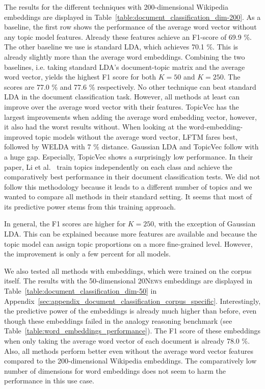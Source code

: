 \documentclass[
        a4paper,
        titlepage,
        twoside,
        parskip,
        numbers=noenddot
        ]{scrbook}
\theoremstyle{break}
\begin{document}
The results for the different techniques with 200-dimensional Wikipedia embeddings are displayed in Table~\ref{table:document_classification_dim-200}.
As a baseline, the first row shows the performance of the average word vector without any topic model features.
Already these features achieve an F1-score of 69.9 \%.
The other baseline we use is standard LDA, which achieves 70.1 \%.
This is already slightly more than the average word embeddings.
Combining the two baselines, i.e. taking standard LDA's document-topic matrix and the average word vector, yields the highest F1 score for both $K = 50$ and $K = 250$.
The scores are 77.0 \% and 77.6 \% respectively.
No other technique can beat standard LDA in the document classification task.
However, all methods at least can improve over the average word vector with their features.
TopicVec has the largest improvements when adding the average word embedding vector, however, it also had the worst results without.
When looking at the word-embedding-improved topic models without the average word vector, LFTM fares best, followed by WELDA with 7 \% distance.
Gaussian LDA and TopicVec follow with a huge gap.
Especially, TopicVec shows a surprisingly low performance.
In their paper,  Li et al.~\cite{Li2016} train topics independently on each class and achieve the comparatively best performance in their document classification tests.
We did not follow this methodology because it leads to a different number of topics and we wanted to compare all methods in their standard setting.
It seems that most of its predictive power stems from this training approach.

In general, the F1 scores are higher for $K = 250$, with the exception of Gaussian LDA.
This can be explained because more features are available and because the topic model can assign topic proportions on a more fine-grained level.
However, the improvement is only a few percent for all models.

We also tested all methods with embeddings, which were trained on the corpus itself.
The results with the 50-dimensional \textsc{20News} embeddings are displayed in Table~\ref{table:document_classification_dim-50} in Appendix~\ref{sec:appendix_document_classification_corpus_specific}.
Interestingly, the predictive power of the embeddings is already much higher than before, even though these embeddings failed in the analogy reasoning benchmark (see Table~\ref{table:word_embeddings_performance}).
The F1 score of these embeddings when only taking the average word vector of each document is already 78.0 \%.
Also, all methods perform better even without the average word vector features compared to the 200-dimensional Wikipedia embeddings.
The comparatively low number of dimensions for word embeddings does not seem to harm the performance in this use case.
\end{document}
